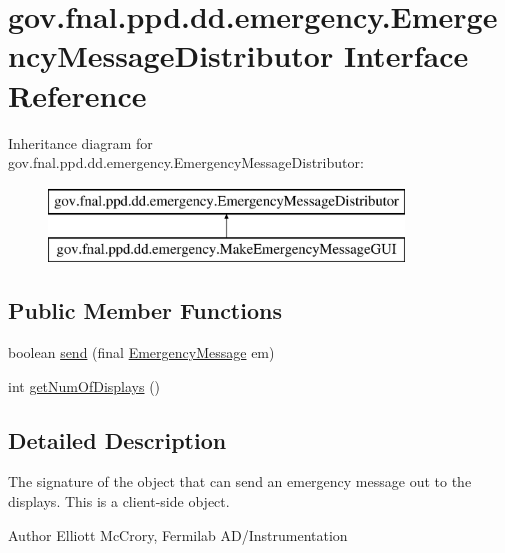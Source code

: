 \hypertarget{interfacegov_1_1fnal_1_1ppd_1_1dd_1_1emergency_1_1EmergencyMessageDistributor}{\section{gov.\-fnal.\-ppd.\-dd.\-emergency.\-Emergency\-Message\-Distributor Interface Reference}
\label{interfacegov_1_1fnal_1_1ppd_1_1dd_1_1emergency_1_1EmergencyMessageDistributor}
}
Inheritance diagram for gov.\-fnal.\-ppd.\-dd.\-emergency.\-Emergency\-Message\-Distributor\-:\begin{figure}[H]
\begin{center}
\leavevmode
\includegraphics[height=2.000000cm]{interfacegov_1_1fnal_1_1ppd_1_1dd_1_1emergency_1_1EmergencyMessageDistributor}
\end{center}
\end{figure}
\subsection*{Public Member Functions}
\begin{DoxyCompactItemize}
\item 
boolean \hyperlink{interfacegov_1_1fnal_1_1ppd_1_1dd_1_1emergency_1_1EmergencyMessageDistributor_aa67e1816eaa0182a8329bce2c1cd6a7a}{send} (final \hyperlink{classgov_1_1fnal_1_1ppd_1_1dd_1_1emergency_1_1EmergencyMessage}{Emergency\-Message} em)
\item 
int \hyperlink{interfacegov_1_1fnal_1_1ppd_1_1dd_1_1emergency_1_1EmergencyMessageDistributor_ae944177d6e61dbea576b27ce2b76f1d9}{get\-Num\-Of\-Displays} ()
\end{DoxyCompactItemize}


\subsection{Detailed Description}
The signature of the object that can send an emergency message out to the displays. This is a client-\/side object.

\begin{DoxyAuthor}{Author}
Elliott Mc\-Crory, Fermilab A\-D/\-Instrumentation 
\end{DoxyAuthor}


